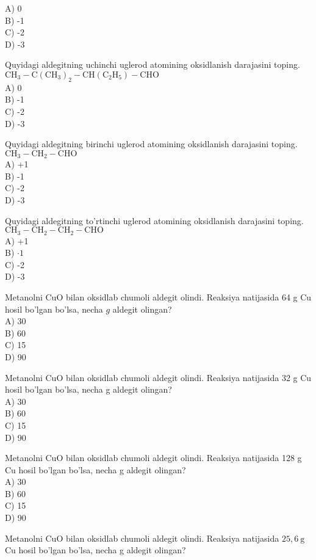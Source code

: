A) 0\\
B) -1\\
C) -2\\
D) -3
  \item Quyidagi aldegitning uchinchi uglerod atomining oksidlanish darajasini toping.\\
$\mathrm{CH}_{3}-\mathrm{C}\left(\mathrm{CH}_{3}\right)_{2}-\mathrm{CH}\left(\mathrm{C}_{2} \mathrm{H}_{5}\right)-\mathrm{CHO}$\\
A) 0\\
B) -1\\
C) -2\\
D) -3
  \item Quyidagi aldegitning birinchi uglerod atomining oksidlanish darajasini toping.\\
$\mathrm{CH}_{3}-\mathrm{CH}_{2}-\mathrm{CHO}$\\
A) +1\\
B) -1\\
C) -2\\
D) -3
  \item Quyidagi aldegitning to'rtinchi uglerod atomining oksidlanish darajasini toping.\\
$\mathrm{CH}_{3}-\mathrm{CH}_{2}-\mathrm{CH}_{2}-\mathrm{CHO}$\\
A) +1\\
B) $\cdot 1$\\
C) -2\\
D) -3
  \item Metanolni CuO bilan oksidlab chumoli aldegit olindi. Reaksiya natijasida 64 g Cu hosil bo'lgan bo'lsa, necha $g$ aldegit olingan?\\
A) 30\\
B) 60\\
C) 15\\
D) 90
  \item Metanolni CuO bilan oksidlab chumoli aldegit olindi. Reaksiya natijasida 32 g Cu hosil bo'lgan bo'lsa, necha g aldegit olingan?\\
A) 30\\
B) 60\\
C) 15\\
D) 90
  \item Metanolni CuO bilan oksidlab chumoli aldegit olindi. Reaksiya natijasida 128 g Cu hosil bo'lgan bo'lsa, necha g aldegit olingan?\\
A) 30\\
B) 60\\
C) 15\\
D) 90
  \item Metanolni CuO bilan oksidlab chumoli aldegit olindi. Reaksiya natijasida $25,6 \mathrm{~g}$ Cu hosil bo'lgan bo'lsa, necha g aldegit olingan?\\
